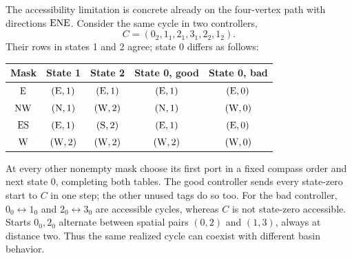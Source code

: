 The accessibility limitation is concrete already on the four-vertex path with
directions $\mathrm{E}\mathrm{N}\mathrm{E}$. Consider the same cycle in two controllers,
\[
 C=(0_2,1_1,2_1,3_1,2_2,1_2).
\]
Their rows in states 1 and 2 agree; state 0 differs as follows:
\begin{center}
\begin{tabular}{ccccc}
\toprule
Mask & State 1 & State 2 & State 0, good & State 0, bad\\
\midrule
$\mathrm{E}$ & $(\mathrm{E},1)$ & $(\mathrm{E},1)$ & $(\mathrm{E},1)$ & $(\mathrm{E},0)$\\
$\mathrm{N}\mathrm{W}$ & $(\mathrm{N},1)$ & $(\mathrm{W},2)$ & $(\mathrm{N},1)$ & $(\mathrm{W},0)$\\
$\mathrm{E}\mathrm{S}$ & $(\mathrm{E},1)$ & $(\mathrm{S},2)$ & $(\mathrm{E},1)$ & $(\mathrm{E},0)$\\
$\mathrm{W}$ & $(\mathrm{W},2)$ & $(\mathrm{W},2)$ & $(\mathrm{W},2)$ & $(\mathrm{W},0)$\\
\bottomrule
\end{tabular}
\end{center}
At every other nonempty mask choose its first port in a fixed compass order and
next state 0, completing both tables. The good controller sends every state-zero
start to $C$ in one step; the other unused tags do so too. For the bad controller,
$0_0\leftrightarrow1_0$ and $2_0\leftrightarrow3_0$ are accessible cycles, whereas
$C$ is not state-zero accessible. Starts $0_0,2_0$ alternate between spatial
pairs $(0,2)$ and $(1,3)$, always at distance two. Thus the same realized cycle
can coexist with different basin behavior.


